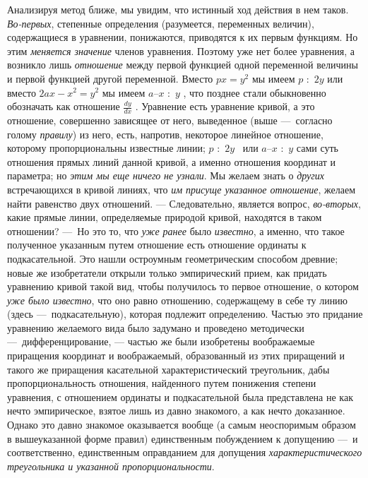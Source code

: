 Анализируя метод ближе, мы увидим, что истинный ход действия в нем таков.
{\em Во-первых}, степенные определения (разумеется,
переменных величин), содержащиеся в уравнении, понижаются, приводятся к их
первым функциям. Но этим {\em меняется значение} членов
уравнения. Поэтому уже нет более уравнения, а возникло лишь
{\em отношение} между первой функцией одной переменной
величины и первой функцией другой переменной. Вместо  $\mathit{px}=y^2$  мы
имеем  $p\text{~}:\text{~}2y$  или вместо  $2\mathit{ax}-x^2=y^2$ мы имеем 
$a\text{–}x\text{~}:\text{~}y$ , что позднее стали обыкновенно обозначать
как отношение  $\frac{\mathit{dy}}{\mathit{dx}}$ . Уравнение есть уравнение
кривой, а это отношение, совершенно зависящее от него, выведенное (выше
—~согласно голому {\em правилу}) из него, есть,
напротив, некоторое линейное отношение, которому пропорциональны известные
линии;  $p\text{~}:\text{~}2y$  \ или  $a\text{–}x\text{~}:\text{~}y$  сами
суть отношения прямых линий данной кривой, а именно отношения координат и
параметра; но {\em этим мы еще ничего
}{\em не узнали}. Мы желаем знать о
{\em других} встречающихся в кривой линиях, что
{\em им присуще указанное отношение}, желаем найти
равенство двух отношений. — Следовательно, является вопрос,
{\em во-вторых}, какие прямые линии, определяемые
природой кривой, находятся в таком отношении? —~Но это то, что
{\em уже ранее} было
{\em известно}, а именно, что такое полученное
указанным путем отношение есть отношение ординаты к подкасательной. Это
нашли остроумным геометрическим способом древние; новые же изобретатели
открыли только эмпирический прием, как придать уравнению кривой такой вид,
чтобы получилось то первое отношение, о котором
{\em уже было известно}, что оно равно отношению,
содержащему в себе ту линию (здесь —~подкасательную), которая подлежит
определению. Частью это придание уравнению желаемого вида было задумано и
проведено методически —~дифференцирование, — частью же были изобретены
воображаемые приращения координат и воображаемый, образованный из этих
приращений и такого же приращения касательной характеристический
треугольник, дабы пропорциональность отношения, найденного путем понижения
степени уравнения, с отношением ординаты и подкасательной была представлена
не как нечто эмпирическое, взятое лишь из давно знакомого, а как нечто
доказанное. Однако это давно знакомое оказывается вообще (а самым
неоспоримым образом в вышеуказанной форме правил) единственным побуждением
к допущению —~и соответственно, единственным оправданием для допущения
{\em характеристического треугольника и указанной
пропорциональности}.

